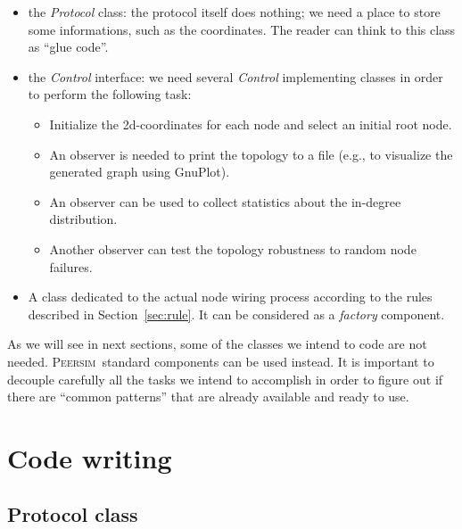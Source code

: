 \documentclass[a4paper,12pt]{article}
\newcommand{\id}[1]{{\scshape\small #1}}
\newcommand{\psim}{\id{Peersim}}
\begin{document}
\begin{itemize}

\item the \emph{Protocol} class: the protocol itself does nothing; we
  need a place to store some informations, such as the coordinates.
The reader can think to this class as ``glue code''.
 
\item the \emph{Control} interface: we need several \emph{Control}
  implementing classes in order to perform the following task:

\begin{itemize}

\item Initialize the 2d-coordinates for each node and select an
  initial root node.

\item An observer is needed to print the topology to a file (e.g., to
  visualize the generated graph using GnuPlot).

\item An observer can be used to collect statistics about the
  in-degree distribution.

\item Another observer can test the topology robustness to random node
  failures.

\end{itemize}

\item A class dedicated to the actual node wiring process according to
  the rules described in Section~\ref{sec:rule}. It can be considered
  as a \emph{factory} component.

\end{itemize}

As we will see in next sections, some of the classes we intend to code
are not needed. \psim~standard components can be used instead. It is
important to decouple carefully all the tasks we intend to accomplish in
order to figure out if there are ``common patterns'' that are already
available and ready to use.


\section{Code writing}

\subsection{Protocol class}
\end{document}
